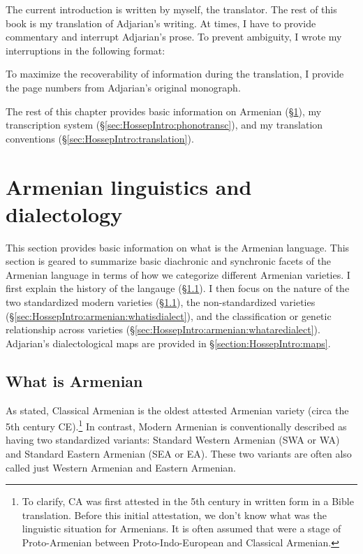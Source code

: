 The current introduction is written by myself, the translator. The rest of this book is my translation of Adjarian's writing. At times, I have to provide commentary and interrupt Adjarian's prose. To prevent ambiguity, I wrote my interruptions in the following format:

\begin{center}
\end{center}

To maximize the recoverability of information during the translation, I provide the page numbers from Adjarian's original monograph. 

The rest of this chapter provides basic information on Armenian (\S\ref{sec:HossepIntro:armenian}), my transcription system (\S\ref{sec:HossepIntro:phonotransc}),   and my translation conventions (\S\ref{sec:HossepIntro:translation}).



\section{Armenian linguistics and dialectology}\label{sec:HossepIntro:armenian}


This section provides basic information on what is the Armenian language. This section is geared to summarize basic diachronic and synchronic facets of the Armenian language in terms of how we categorize different Armenian varieties. I first explain the history of the langauge (\S\ref{sec:HossepIntro:armenian:whatisarm}). I then focus on the nature of the two standardized modern varieties  (\S\ref{sec:HossepIntro:armenian:whatisarm}), the non-standardized varieties (\S\ref{sec:HossepIntro:armenian:whatisdialect}), and the classification or genetic relationship across   varieties (\S\ref{sec:HossepIntro:armenian:whataredialect}). Adjarian's dialectological maps are provided in \S\ref{section:HossepIntro:maps}.  
\subsection{What is Armenian}\label{sec:HossepIntro:armenian:whatisarm}

As stated, Classical Armenian is the oldest attested Armenian variety (circa the 5th century CE).\footnote{To clarify, CA was first attested in the 5th century in written form in a Bible translation. Before this initial attestation, we don't know what was the linguistic situation for Armenians. It is often assumed that were a stage of Proto-Armenian between Proto-Indo-European and Classical Armenian. } In contrast, Modern Armenian is conventionally described as having two standardized variants: Standard Western Armenian (SWA or WA) and Standard Eastern Armenian (SEA or EA). These two variants are often also called just Western Armenian and Eastern Armenian. 

